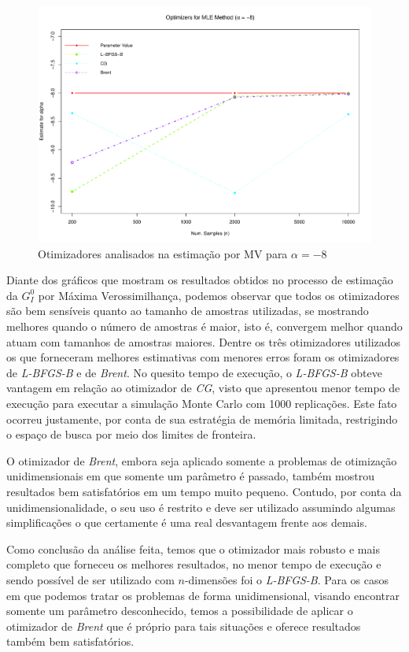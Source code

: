\documentclass[12pt]{article}
\begin{document}
\begin{figure}[H]
     \centering
     \includegraphics[scale=0.5]{plots/OptimsAlpha-8.pdf}
     \caption{Otimizadores analisados na estimação por MV para $\alpha = -8$}
     \label{graf_4}
\end{figure}

Diante dos gráficos que mostram os resultados obtidos no processo de estimação da $G_I^0$ por Máxima Verossimilhança, podemos observar que todos os otimizadores são bem sensíveis quanto ao tamanho de amostras utilizadas, se mostrando melhores quando o número de amostras é maior, isto é, convergem melhor quando atuam com tamanhos de amostras maiores. Dentre os três otimizadores utilizados os que forneceram melhores estimativas com menores erros foram os otimizadores de \emph{L-BFGS-B} e de \emph{Brent}. No quesito tempo de execução, o \emph{L-BFGS-B} obteve vantagem em relação ao otimizador de \emph{CG}, visto que apresentou menor tempo de execução para executar a simulação Monte Carlo com 1000 replicações. Este fato ocorreu justamente, por conta de sua estratégia de memória limitada, restrigindo o espaço de busca por meio dos limites de fronteira.

O otimizador de \emph{Brent}, embora seja aplicado somente a problemas de otimização unidimensionais em que somente um parâmetro é passado, também mostrou resultados bem satisfatórios em um tempo muito pequeno. Contudo, por conta da unidimensionalidade, o seu uso é restrito e deve ser utilizado assumindo algumas simplificações o que certamente é uma real desvantagem frente aos demais.

Como conclusão da análise feita, temos que o otimizador mais robusto e mais completo que forneceu os melhores resultados, no menor tempo de execução e sendo possível de ser utilizado com $n$-dimensões foi o \emph{L-BFGS-B}. Para os casos em que podemos tratar os problemas de forma unidimensional, visando encontrar somente um parâmetro desconhecido, temos a possibilidade de aplicar o otimizador de \emph{Brent} que é próprio para tais situações e oferece resultados também bem satisfatórios.
\end{document}
